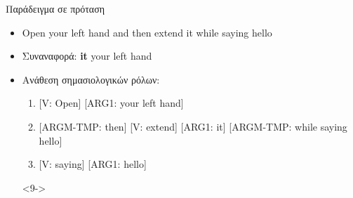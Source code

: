 \documentclass{beamer}
\def\textenglish{}
\newcommand{\en}[1]{\textenglish{#1}}
\begin{document}
\begin{frame}{Παράδειγμα σε πρόταση}
    \begin{itemize}
        \item<1-> Open your left hand and then extend it while saying hello
        \item<2-> Συναναφορά: \textbf{it} \textrightarrow your left hand
        \item<3-> Ανάθεση σημασιολογικών ρόλων:
              \begin{enumerate}
                  \item \en{[V: Open] [ARG1: your left hand]}\\
                  \item \en{[ARGM-TMP: then] [V: extend] [ARG1: it] [ARGM-TMP: while saying hello]}\\
                  \item \en{[V: saying] [ARG1: hello]}\\
              \end{enumerate}
        \item[]<9-> \phantom{x}
    \end{itemize}
\end{frame}
\end{document}
